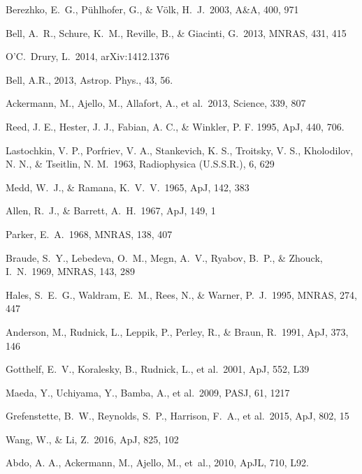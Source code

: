 \documentclass{PoS}
\newcommand\apj{ApJ}
\newcommand\aap{A\&A}
\newcommand\apjl{ApJ}
\newcommand\pasj{PASJ}
\begin{document}
\begin{thebibliography}{99}

 Berezhko, E.~G., P{\"u}hlhofer, G., \& V{\"o}lk, H.~J.\ 2003, \aap, 400, 971 

 Bell, A.~R., Schure, K.~M., Reville, B., \& Giacinti, G.\ 2013, MNRAS, 431, 415 

 O'C.~Drury, L.\ 2014, arXiv:1412.1376

 Bell, A.R., 2013, Astrop. Phys., 43, 56.

 Ackermann, M., Ajello, M., Allafort, A., et al.\ 2013, Science, 339, 807

Reed, J. E., Hester, J. J., Fabian, A. C., \& Winkler, P. F. 1995, ApJ,
440, 706.

 Lastochkin, V. P., Porfriev, V. A., Stankevich, K. S., Troitsky, V. S., Kholodilov, N. N., \& Tseitlin, N. M.\ 1963, Radiophysica (U.S.S.R.), 6, 629

 Medd, W.~J., \& Ramana, K.~V.~V.\ 1965, \apj, 142, 383

 Allen, R.~J., \& Barrett, A.~H.\ 1967, \apj, 149, 1

 Parker, E.~A.\ 1968, MNRAS, 138, 407

 Braude, S.~Y., Lebedeva, O.~M., Megn, A.~V., Ryabov, B.~P., \& Zhouck, I.~N.\ 1969, MNRAS, 143, 289

 Hales, S.~E.~G., Waldram, E.~M., Rees, N., \& Warner, P.~J.\ 1995, MNRAS, 274, 447

 Anderson, M., Rudnick, L., Leppik, P., Perley, R., \& Braun, R.\ 1991, \apj, 373, 146 


 Gotthelf, E.~V., Koralesky, B., Rudnick, L., et al.\ 2001, \apjl, 552, L39 

 Maeda, Y., Uchiyama, Y., Bamba, A., et al.\ 2009, \pasj, 61, 1217 

 Grefenstette, B.~W., Reynolds, S.~P., Harrison, F.~A., et al.\ 2015, \apj, 802, 15 

 Wang, W., \& Li, Z.\ 2016, \apj, 825, 102 

 Abdo, A. A., Ackermann, M., Ajello, M., {et~al.}, 2010, ApJL, 710, L92.


\end{thebibliography}
\end{document}
